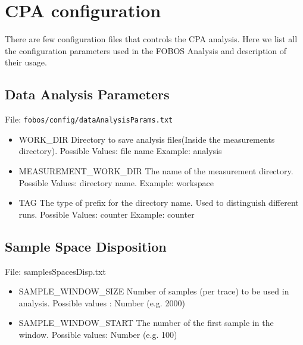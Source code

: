 \section{CPA configuration}

There are few configuration files that controls the CPA analysis.
Here we list all the configuration parameters used in the FOBOS Analysis and description of their usage.
\subsection{Data Analysis Parameters}

File: \texttt{fobos/config/dataAnalysisParams.txt}
\begin{itemize}
 \item WORK\_DIR \newline
 Directory to save analysis files(Inside the measurements directory). \newline
 Possible Values: file name \newline
 Example: analysis 
 \item MEASUREMENT\_WORK\_DIR \newline
 The name of the measurement directory. \newline
 Possible Values: directory name. \newline
 Example: workspace
 \item TAG \newline
 The type of prefix for the directory name. Used to distinguish different runs. \newline
 Possible Values: counter \newline
 Example: counter
\end{itemize}

\subsection{Sample Space Disposition}

File: samplesSpacesDisp.txt
\begin{itemize}
 \item SAMPLE\_WINDOW\_SIZE \newline
  Number of samples (per trace) to be used in analysis. \newline
  Possible values : Number (e.g. 2000)
 \item SAMPLE\_WINDOW\_START \newline
 The number of the first sample in the window.\newline
 Possible values: Number (e.g. 100)
\end{itemize}

